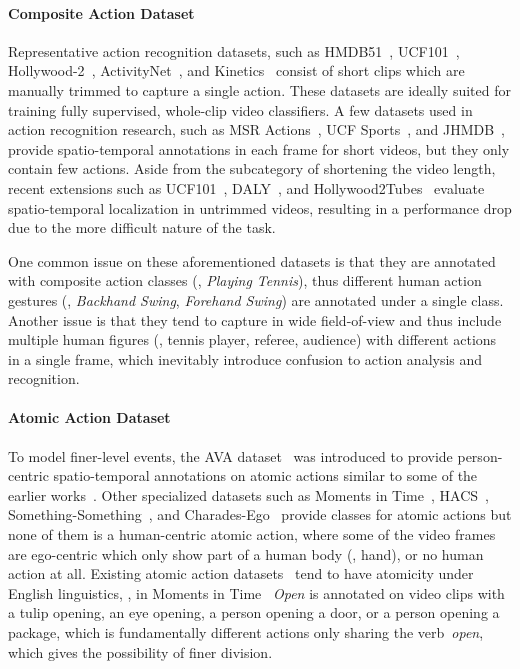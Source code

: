 \documentclass[10pt,twocolumn,letterpaper]{article}
\begin{document}
\paragraph{Composite Action Dataset}
Representative action recognition datasets, such as HMDB51~\cite{HMDB51}, UCF101~\cite{ucf101}, Hollywood-2~\cite{DBLP:conf/cvpr/MarszalekLS09}, ActivityNet~\cite{activitynet}, and Kinetics~\cite{kinetics700,kinetics400} consist of short clips which are manually trimmed to capture a single action. These datasets are ideally suited for training fully supervised, whole-clip video classifiers. A few datasets used in action recognition research, such as MSR Actions~\cite{DBLP:conf/cvpr/YuanLW09}, UCF Sports~\cite{DBLP:conf/cvpr/RodriguezAS08}, and JHMDB~\cite{DBLP:conf/iccv/JhuangGZSB13}, provide spatio-temporal annotations in each frame for short videos, but they only contain few actions. 
Aside from the subcategory of shortening the video length, recent extensions such as UCF101~\cite{ucf101}, DALY~\cite{DBLP:journals/corr/WeinzaepfelMS16}, and Hollywood2Tubes~\cite{DBLP:conf/eccv/MettesGS16} evaluate spatio-temporal localization in untrimmed videos, resulting in a performance drop due to the more difficult nature of the task. 

One common issue on these aforementioned datasets is that they are annotated with composite action classes (\eg, \textit{Playing Tennis}), thus different human action gestures (\eg, \textit{Backhand Swing}, \textit{Forehand Swing}) are annotated under a single class. Another  issue is that they tend to capture in wide field-of-view and thus include multiple human figures (\eg, tennis player, referee, audience) with different actions in a single frame, which inevitably introduce confusion to action analysis and recognition. 




\vspace{-1em}
\paragraph{Atomic Action Dataset}

To model finer-level events, the AVA dataset~\cite{AVA} was introduced to provide person-centric spatio-temporal annotations on atomic actions similar to some of the earlier works~\cite{DBLP:conf/iccv/BlankGSIB05,gaidon2013temporal,DBLP:conf/icpr/SchuldtLC04}.
Other specialized datasets such as Moments in Time~\cite{momentsintime}, HACS~\cite{zhao2019hacs}, Something-Something~\cite{goyal2017something}, and Charades-Ego~\cite{sigurdsson2016hollywood} provide classes for atomic actions but none of them is a human-centric atomic action, where some of the video frames are ego-centric which only show part of a human body (\eg, hand), or no human action at all. Existing atomic action datasets~\cite{AVA,momentsintime} tend to have atomicity under English linguistics, \eg, in Moments in Time~\cite{momentsintime} \textit{Open} is annotated on video clips with a tulip opening, an eye opening, a person opening a door, or a person opening a package, which is fundamentally different actions only sharing the verb~\textit{open}, which gives the possibility of finer division.
\end{document}
